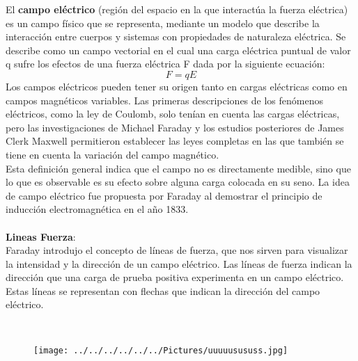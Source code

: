 \documentclass[11pt,a4paper]{article}
\begin{document}
El \textbf{campo el\'{e}ctrico} (regi\'{o}n del espacio en la que interact\'{u}a la fuerza el\'{e}ctrica) es un campo f\'{i}sico que se representa, mediante un modelo que describe la interacci\'{o}n entre cuerpos y sistemas con propiedades de naturaleza el\'{e}ctrica. ​Se describe como un campo vectorial en el cual una carga el\'{e}ctrica puntual de valor q sufre los efectos de una fuerza el\'{e}ctrica F dada por la siguiente ecuaci\'{o}n:
\[F=qE\]
Los campos el\'{e}ctricos pueden tener su origen tanto en cargas el\'{e}ctricas como en campos magn\'{e}ticos variables. Las primeras descripciones de los fen\'{o}menos el\'{e}ctricos, como la ley de Coulomb, solo ten\'{i}an en cuenta las cargas el\'{e}ctricas, pero las investigaciones de Michael Faraday y los estudios posteriores de James Clerk Maxwell permitieron establecer las leyes completas en las que tambi\'{e}n se tiene en cuenta la variaci\'{o}n del campo magn\'{e}tico.
\\
Esta definici\'{o}n general indica que el campo no es directamente medible, sino que lo que es observable es su efecto sobre alguna carga colocada en su seno. La idea de campo el\'{e}ctrico fue propuesta por Faraday al demostrar el principio de inducci\'{o}n electromagn\'{e}tica en el a\~{n}o 1833.
\\
\\
\textbf{Lineas Fuerza}:\\
Faraday introdujo el concepto de l\'{i}neas de fuerza, que nos sirven para visualizar la intensidad y la direcci\'{o}n de un campo el\'{e}ctrico. Las l\'{i}neas de fuerza indican la direcci\'{o}n que una carga de prueba positiva experimenta en un campo el\'{e}ctrico. Estas l\'{i}neas se representan con flechas que indican la direcci\'{o}n del campo el\'{e}ctrico.

\\
\begin{figure}[hbtp]
\centering
\texttt{[image: ../../../../../../Pictures/uuuuusususs.jpg]}
\end{figure}
\\
\end{document}

